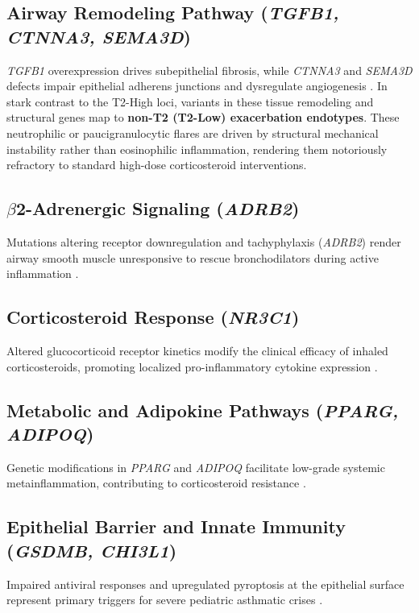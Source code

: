 \documentclass[11pt,a4paper]{article}
\begin{document}
\subsection{Airway Remodeling Pathway (\textit{TGFB1, CTNNA3, SEMA3D})}
\textit{TGFB1} overexpression drives subepithelial fibrosis, while \textit{CTNNA3} and \textit{SEMA3D} defects impair epithelial adherens junctions and dysregulate angiogenesis \cite{KowinJonakowski2025, IerodiakonouPortelli2016}. In stark contrast to the T2-High loci, variants in these tissue remodeling and structural genes map to \textbf{non-T2 (T2-Low) exacerbation endotypes}. These neutrophilic or paucigranulocytic flares are driven by structural mechanical instability rather than eosinophilic inflammation, rendering them notoriously refractory to standard high-dose corticosteroid interventions.

\subsection{$\beta$2-Adrenergic Signaling (\textit{ADRB2})}
Mutations altering receptor downregulation and tachyphylaxis (\textit{ADRB2}) render airway smooth muscle unresponsive to rescue bronchodilators during active inflammation \cite{KachkovskaKovchun2021, MohamedHusseinSayed2018}.

\subsection{Corticosteroid Response (\textit{NR3C1})}
Altered glucocorticoid receptor kinetics modify the clinical efficacy of inhaled corticosteroids, promoting localized pro-inflammatory cytokine expression \cite{PerezGarciaEspuelaOrtiz2023, KeskinUluca2016}.

\subsection{Metabolic and Adipokine Pathways (\textit{PPARG, ADIPOQ})}
Genetic modifications in \textit{PPARG} and \textit{ADIPOQ} facilitate low-grade systemic metainflammation, contributing to corticosteroid resistance \cite{GajewskaKuryowicz2016, BannoReddy2018}.

\subsection{Epithelial Barrier and Innate Immunity (\textit{GSDMB, CHI3L1})}
Impaired antiviral responses and upregulated pyroptosis at the epithelial surface represent primary triggers for severe pediatric asthmatic crises \cite{DasMiller2016, RuanShi2020}.
\end{document}
